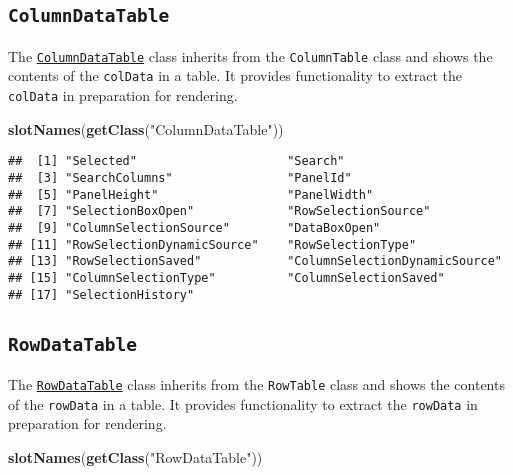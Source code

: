 \documentclass[
]{book}
\newenvironment{Shaded}{\begin{snugshade}}{\end{snugshade}}
\newcommand{\KeywordTok}[1]{\textcolor[rgb]{0.13,0.29,0.53}{\textbf{#1}}}
\newcommand{\NormalTok}[1]{#1}
\newcommand{\StringTok}[1]{\textcolor[rgb]{0.31,0.60,0.02}{#1}}
\begin{document}
\hypertarget{columndatatable}{%
\subsection{\texorpdfstring{\texttt{ColumnDataTable}}{ColumnDataTable}}\label{columndatatable}}

The \href{https://isee.github.io/iSEE/reference/ColumnDataTable-class.html}{\texttt{ColumnDataTable}} class inherits from the \texttt{ColumnTable} class and shows the contents of the \texttt{colData} in a table.
It provides functionality to extract the \texttt{colData} in preparation for rendering.

\begin{Shaded}
\begin{Highlighting}[]
\KeywordTok{slotNames}\NormalTok{(}\KeywordTok{getClass}\NormalTok{(}\StringTok{"ColumnDataTable"}\NormalTok{))}
\end{Highlighting}
\end{Shaded}

\begin{verbatim}
##  [1] "Selected"                     "Search"                      
##  [3] "SearchColumns"                "PanelId"                     
##  [5] "PanelHeight"                  "PanelWidth"                  
##  [7] "SelectionBoxOpen"             "RowSelectionSource"          
##  [9] "ColumnSelectionSource"        "DataBoxOpen"                 
## [11] "RowSelectionDynamicSource"    "RowSelectionType"            
## [13] "RowSelectionSaved"            "ColumnSelectionDynamicSource"
## [15] "ColumnSelectionType"          "ColumnSelectionSaved"        
## [17] "SelectionHistory"
\end{verbatim}

\hypertarget{rowdatatable}{%
\subsection{\texorpdfstring{\texttt{RowDataTable}}{RowDataTable}}\label{rowdatatable}}

The \href{https://isee.github.io/iSEE/reference/RowDataTable-class.html}{\texttt{RowDataTable}} class inherits from the \texttt{RowTable} class and shows the contents of the \texttt{rowData} in a table.
It provides functionality to extract the \texttt{rowData} in preparation for rendering.

\begin{Shaded}
\begin{Highlighting}[]
\KeywordTok{slotNames}\NormalTok{(}\KeywordTok{getClass}\NormalTok{(}\StringTok{"RowDataTable"}\NormalTok{))}
\end{Highlighting}
\end{Shaded}
\end{document}
